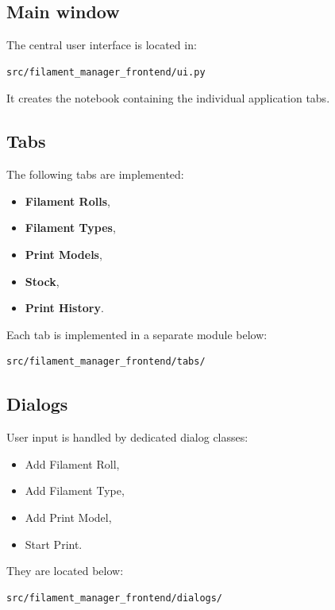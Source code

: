 \documentclass[a4paper,11pt]{article}
\begin{document}
\subsection{Main window}

The central user interface is located in:

\begin{lstlisting}
src/filament_manager_frontend/ui.py
\end{lstlisting}

It creates the notebook containing the individual application tabs.

\subsection{Tabs}

The following tabs are implemented:

\begin{itemize}
  \item \textbf{Filament Rolls},
  \item \textbf{Filament Types},
  \item \textbf{Print Models},
  \item \textbf{Stock},
  \item \textbf{Print History}.
\end{itemize}

Each tab is implemented in a separate module below:

\begin{lstlisting}
src/filament_manager_frontend/tabs/
\end{lstlisting}

\subsection{Dialogs}

User input is handled by dedicated dialog classes:

\begin{itemize}
  \item Add Filament Roll,
  \item Add Filament Type,
  \item Add Print Model,
  \item Start Print.
\end{itemize}

They are located below:

\begin{lstlisting}
src/filament_manager_frontend/dialogs/
\end{lstlisting}
\end{document}
